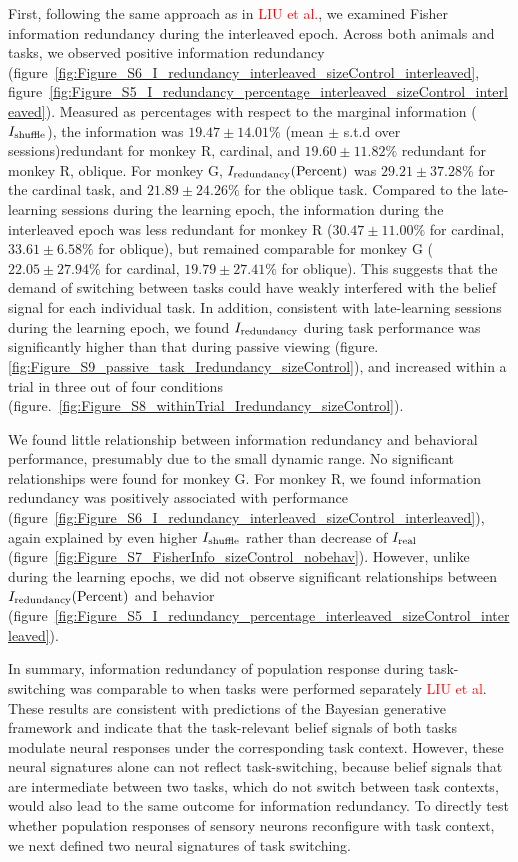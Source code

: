\documentclass[lineno,pdflatex,sn-basic]{sn-jnl}%
\newcommand{\Is}{I_{\rm shuffle}}
\newcommand{\Ir}{I_{\rm real}} %
\newcommand{\Idelta}{I_{\rm redundancy}}
\theoremstyle{thmstyleone}%
\theoremstyle{thmstyletwo}%
\theoremstyle{thmstylethree}%
\begin{document}
First, following the same approach as in \textcolor{red}{LIU et al.}, we examined Fisher information redundancy during the interleaved epoch. Across both animals and tasks, we observed positive information redundancy (figure~\ref{fig:Figure_S6_I_redundancy_interleaved_sizeControl_interleaved}, figure~\ref{fig:Figure_S5_I_redundancy_percentage_interleaved_sizeControl_interleaved}). Measured as percentages with respect to the marginal information ($\Is$), the information was $19.47\pm 14.01\%$ (mean $\pm$ s.t.d over sessions)redundant for monkey R, cardinal, and $19.60\pm 11.82\%$ redundant for monkey R, oblique. For monkey G, $\Idelta (\textrm{Percent})$ was $ 29.21\pm  37.28\%$ for the cardinal task, and  $21.89\pm 24.26\%$ for the oblique task. Compared to the late-learning sessions during the learning epoch, the information during the interleaved epoch was less redundant for monkey R ($30.47\pm11.00\%$ for cardinal, $33.61\pm6.58\%$ for oblique), but remained comparable for monkey G  ($22.05\pm27.94 \%$ for cardinal, $ 19.79\pm27.41\%$ for oblique). This suggests that the demand of switching between tasks could have weakly interfered with the belief signal for each individual task. In addition, consistent with late-learning sessions during the learning epoch, we found $\Idelta$ during task performance was significantly higher than that during passive viewing (figure.\ref{fig:Figure_S9_passive_task_Iredundancy_sizeControl}), and increased within a trial in three out of four conditions (figure.~\ref{fig:Figure_S8_withinTrial_Iredundancy_sizeControl}).


We found little relationship between information redundancy and behavioral performance, presumably due to the small dynamic range. No significant relationships were found for monkey G. For monkey R, we found information redundancy was positively associated with performance (figure~\ref{fig:Figure_S6_I_redundancy_interleaved_sizeControl_interleaved}), again explained by even higher $\Is$ rather than decrease of $\Ir$ (figure~\ref{fig:Figure_S7_FisherInfo_sizeControl_nobehav}). However, unlike during the learning epochs, we did not observe significant relationships between $\Idelta (\textrm{Percent})$ and behavior (figure~\ref{fig:Figure_S5_I_redundancy_percentage_interleaved_sizeControl_interleaved}).


In summary, information redundancy of population response during task-switching was comparable to when tasks were performed separately \textcolor{red}{LIU et al}. These results are consistent with predictions of the Bayesian generative framework and indicate that the task-relevant belief signals of both tasks modulate neural responses under the corresponding task context. However, these neural signatures alone can not reflect task-switching, because belief signals that are intermediate between two tasks, which do not switch between task contexts, would also lead to the same outcome for information redundancy. To directly test whether population responses of sensory neurons reconfigure with task context, we next defined two neural signatures of task switching.
\end{document}

